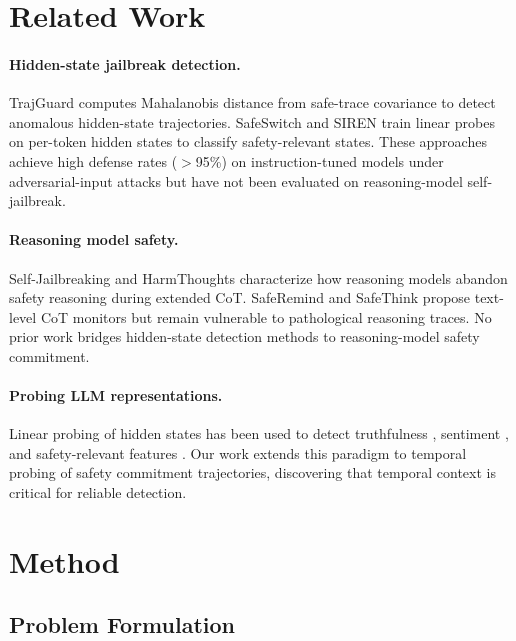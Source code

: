 \documentclass[11pt,a4paper]{article}
\begin{document}
\section{Related Work}
\label{sec:related}

\paragraph{Hidden-state jailbreak detection.}
TrajGuard \cite{xie2024trajguard} computes Mahalanobis distance from safe-trace covariance to detect anomalous hidden-state trajectories.
SafeSwitch \cite{zheng2024safeswitch} and SIREN \cite{chen2024siren} train linear probes on per-token hidden states to classify safety-relevant states.
These approaches achieve high defense rates ($>$95\%) on instruction-tuned models under adversarial-input attacks but have not been evaluated on reasoning-model self-jailbreak.

\paragraph{Reasoning model safety.}
Self-Jailbreaking \cite{jiang2025safechain} and HarmThoughts \cite{tang2025harmbench} characterize how reasoning models abandon safety reasoning during extended CoT.
SafeRemind \cite{wang2024saferemind} and SafeThink \cite{zhong2024safethink} propose text-level CoT monitors but remain vulnerable to pathological reasoning traces.
No prior work bridges hidden-state detection methods to reasoning-model safety commitment.

\paragraph{Probing LLM representations.}
Linear probing of hidden states has been used to detect truthfulness \cite{burns2023discovering}, sentiment \cite{li2024inference}, and safety-relevant features \cite{arditi2024refusal}.
Our work extends this paradigm to temporal probing of safety commitment trajectories, discovering that temporal context is critical for reliable detection.

\section{Method}
\label{sec:method}

\subsection{Problem Formulation}
\end{document}
